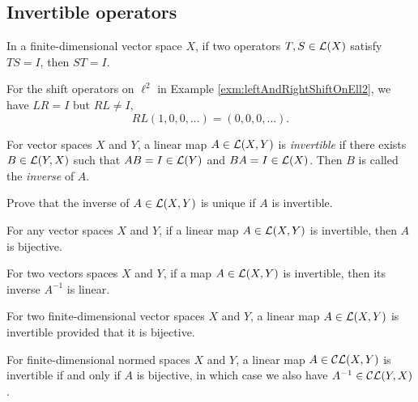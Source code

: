 \subsection{Invertible operators}
\label{sec:invertible-operators}

\begin{lem}
  In a finite-dimensional vector space $X$, 
  if two operators $T,S\in {\cal L}(X)$ satisfy
  $TS = I$, then $ST = I$.
\end{lem}

\begin{exm}
  For the shift operators on $\ell^2$
  in Example \ref{exm:leftAndRightShiftOnEll2},
  we have $LR=I$ but $RL\ne I$,
  \begin{displaymath}
    RL(1,0,0,\ldots) = (0,0,0,\ldots).
  \end{displaymath}
\end{exm}

\begin{defn}
  \label{def:invertibleOps}
  For vector spaces $X$ and $Y$,
  a linear map \mbox{$A\in {\cal L}(X,Y)$} is \emph{invertible}
  if there exists $B\in {\cal L}(Y,X)$
  such that $AB=I\in {\cal L}(Y)$
  and $BA=I\in {\cal L}(X)$. 
  Then $B$ is called the \emph{inverse} of $A$.
\end{defn}

\begin{exc}
  Prove that the inverse of $A\in {\cal L}(X,Y)$ is unique
  if $A$ is invertible.
\end{exc}

\begin{lem}
  \label{lem:invertibleImpliesBijective}
  For any vector spaces $X$ and $Y$, 
  if a linear map $A\in {\cal L}(X,Y)$ is invertible, 
  then $A$ is bijective.
\end{lem}

\begin{lem}
  \label{lem:invertibleCLmapIsLinear}
  For two vectors spaces $X$ and $Y$, 
  if a map $A\in {\cal L}(X,Y)$ is invertible,
  then its inverse $A^{-1}$ is linear.
\end{lem}

\begin{lem}
  \label{lem:bijectiveImpliesInvertibleFiniteDim}
  For two finite-dimensional vector spaces $X$ and $Y$, 
  a linear map $A\in {\cal L}(X,Y)$ is invertible
  provided that it is bijective.
\end{lem}

\begin{thm}
  For finite-dimensional normed spaces $X$ and $Y$,
  a linear map $A\in {\cal CL}(X,Y)$ is invertible
  if and only if $A$ is bijective,
  in which case we also have $A^{-1}\in {\cal CL}(Y,X)$. 
\end{thm}

